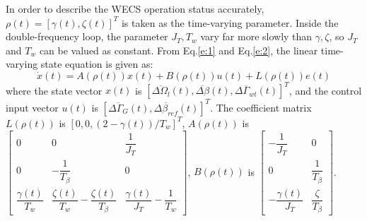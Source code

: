 \documentclass[english]{cccconf}
\begin{document}
In order to describe the WECS operation status accurately,
$\rho(t)=[\gamma(t), \zeta(t)]^T$ is taken as the time-varying parameter. Inside the
double-frequency loop, the parameter $J_T, T_w$ vary far more slowly than $\gamma, \zeta$,
so $J_T$ and $T_w$ can be valued as constant. From Eq.\ref{e:1} and Eq.\ref{e:2}, the
linear time-varying state equation is given as:
\begin{equation}\label{e:3}
\dot{x}(t)=A(\rho(t))x(t) + B(\rho(t))u(t) + L(\rho(t))e(t)
\end{equation}
where the state vector $x(t)$ is $[\overline{\Delta\Omega_l}(t), \overline{\Delta\beta}(t),
\overline{\Delta\Gamma_{wt}}(t)]^T$, and the control input vector $u(t)$ is
$[\overline{\Delta\Gamma_G}(t), \overline{\Delta\beta_{ref}}(t)]^T $. The coefficient matrix
$L(\rho(t))$ is $[0, 0, (2-\gamma(t))/T_w]^T$, $A(\rho(t))$ is
$ \begin{bmatrix}
0 & 0 & \dfrac{1}{J_T} \\
0 & -\dfrac{1}{T_\beta} & 0 \\
\dfrac{\gamma(t)}{T_w} & \dfrac{\zeta(t)}{T_w}-\dfrac{\zeta(t)}{T_\beta} & \dfrac{\gamma(t)}{J_T}-\dfrac{1}{T_w}
\end{bmatrix}
$, \newline
$B(\rho(t))$ is
$\begin{bmatrix}
-\dfrac{1}{J_T} & 0 \\
0 & \dfrac{1}{T_\beta} \\
-\dfrac{\gamma(t)}{J_T} & \dfrac{\zeta}{T_\beta}
\end{bmatrix}$.
\end{document}
